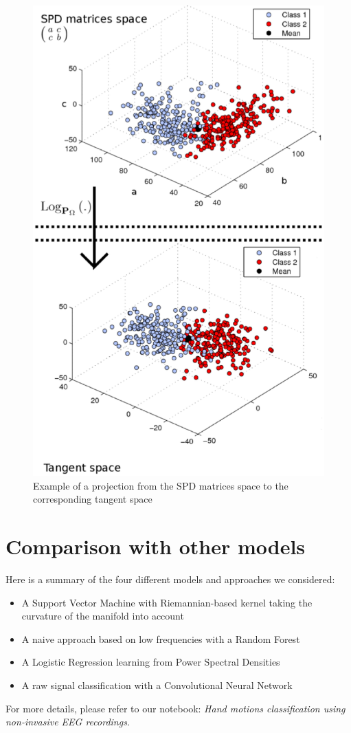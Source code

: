 \documentclass[a4paper,11pt]{report}
\begin{document}
\begin{figure}[H]
\begin{center}
  \includegraphics[width=.8\textwidth]{imgs/ts.eps}
  \caption{\citep{BARACHANT2013172} Example of a projection from the SPD matrices space to the corresponding tangent space}
  \end{center}
\end{figure}


\section{Comparison with other models}

Here is a summary of the four different models and approaches we considered:
\begin{itemize}
  \item A Support Vector Machine with Riemannian-based kernel taking the curvature of the manifold into account
  \item A naive approach based on low frequencies with a Random Forest
  \item A Logistic Regression learning from Power Spectral Densities
  \item A raw signal classification with a Convolutional Neural Network
\end{itemize}
For more details, please refer to our notebook:
\textit{Hand motions classification using non-invasive EEG recordings}.
\end{document}
